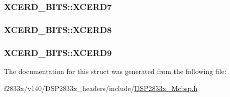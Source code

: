 \subsubsection[{X\+C\+E\+R\+D7}]{ X\+C\+E\+R\+D\+\_\+\+B\+I\+T\+S\+::\+X\+C\+E\+R\+D7}\label{struct_x_c_e_r_d___b_i_t_s_a9616cac924264c4b73fd0d1fbdbce157}
\hypertarget{struct_x_c_e_r_d___b_i_t_s_aed6197031934b810fbb06e91f031f9fa}{}
\subsubsection[{X\+C\+E\+R\+D8}]{ X\+C\+E\+R\+D\+\_\+\+B\+I\+T\+S\+::\+X\+C\+E\+R\+D8}\label{struct_x_c_e_r_d___b_i_t_s_aed6197031934b810fbb06e91f031f9fa}
\hypertarget{struct_x_c_e_r_d___b_i_t_s_af497908c7d70cf41f8fd09a2a2b29df3}{}
\subsubsection[{X\+C\+E\+R\+D9}]{ X\+C\+E\+R\+D\+\_\+\+B\+I\+T\+S\+::\+X\+C\+E\+R\+D9}\label{struct_x_c_e_r_d___b_i_t_s_af497908c7d70cf41f8fd09a2a2b29df3}


The documentation for this struct was generated from the following file\+:\begin{DoxyCompactItemize}
\item 
f2833x/v140/\+D\+S\+P2833x\+\_\+headers/include/\hyperlink{_d_s_p2833x___mcbsp_8h}{D\+S\+P2833x\+\_\+\+Mcbsp.\+h}\end{DoxyCompactItemize}
